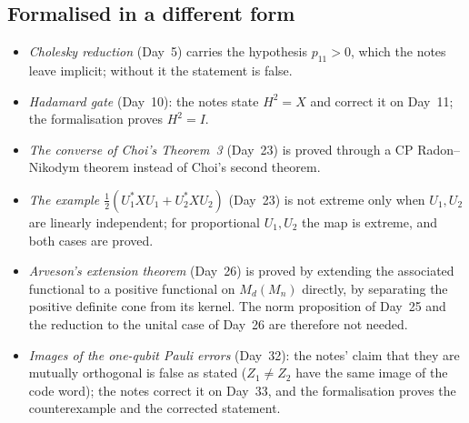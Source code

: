 \documentclass[11pt,a4paper]{article}
\theoremstyle{definition}
\begin{document}
\subsection*{Formalised in a different form}
\begin{itemize}
\item \emph{Cholesky reduction} (Day~5) carries the hypothesis $p_{11}>0$, which the notes leave
  implicit; without it the statement is false.
\item \emph{Hadamard gate} (Day~10): the notes state $H^2=X$ and correct it on Day~11; the
  formalisation proves $H^2=I$.
\item \emph{The converse of Choi's Theorem~3} (Day~23) is proved through a CP
  Radon--Nikodym theorem instead of Choi's second theorem.
\item \emph{The example $\tfrac12(U_1^*XU_1+U_2^*XU_2)$} (Day~23) is not extreme only when
  $U_1,U_2$ are linearly independent; for proportional $U_1,U_2$ the map is extreme, and both
  cases are proved.
\item \emph{Arveson's extension theorem} (Day~26) is proved by extending the associated
  functional to a positive functional on $M_d(M_n)$ directly, by separating the positive
  definite cone from its kernel.  The norm proposition of Day~25 and the reduction to the
  unital case of Day~26 are therefore not needed.
\item \emph{Images of the one-qubit Pauli errors} (Day~32): the notes' claim that they are
  mutually orthogonal is false as stated ($Z_1\neq Z_2$ have the same image of the code word);
  the notes correct it on Day~33, and the formalisation proves the counterexample and the
  corrected statement.
\end{itemize}
\end{document}
